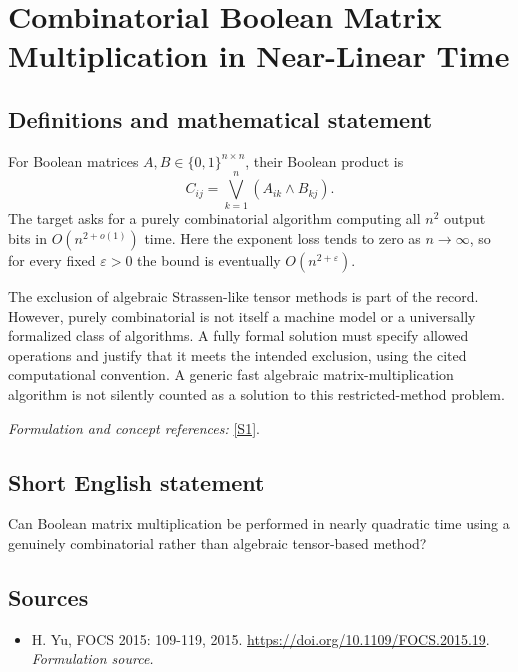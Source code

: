 \documentclass[11pt]{article}
\begin{document}
\section*{\texorpdfstring{Combinatorial Boolean Matrix Multiplication in Near-Linear Time}{Combinatorial Boolean Matrix Multiplication in Near-Linear Time}}\label{480}
\subsection{Definitions and mathematical statement}
For Boolean matrices $A,B\in\{0,1\}^{n\times n}$, their Boolean product is
\[
 C_{ij}=\bigvee_{k=1}^n(A_{ik}\wedge B_{kj}).
\]
The target asks for a purely combinatorial algorithm computing all $n^2$ output bits in $O(n^{2+o(1)})$ time. Here the exponent loss tends to zero as $n\to\infty$, so for every fixed ${\varepsilon}>0$ the bound is eventually $O(n^{2+{\varepsilon}})$.

The exclusion of algebraic Strassen-like tensor methods is part of the record. However, purely combinatorial is not itself a machine model or a universally formalized class of algorithms. A fully formal solution must specify allowed operations and justify that it meets the intended exclusion, using the cited computational convention. A generic fast algebraic matrix-multiplication algorithm is not silently counted as a solution to this restricted-method problem.
\par\smallskip\textit{Formulation and concept references:} \href{https://doi.org/10.1109/FOCS.2015.19}{[S1]}.

\subsection{Short English statement}
Can Boolean matrix multiplication be performed in nearly quadratic time using a genuinely combinatorial rather than algebraic tensor-based method?
\subsection{Sources}
\begin{itemize}
\item[S1]H. Yu, FOCS 2015: 109-119, 2015.
\url{https://doi.org/10.1109/FOCS.2015.19}.
\textit{Formulation source.}
\end{itemize}
\end{document}
